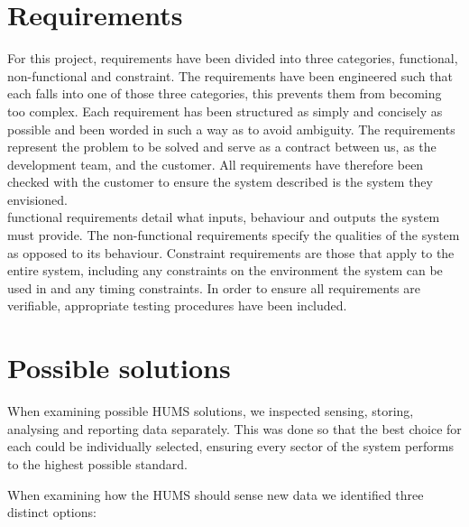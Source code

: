 \documentclass[10pt,a4paper]{article}
\begin{document}
\section{Requirements}

For this project, requirements have been divided into three categories,
functional, non-functional and constraint. The requirements have been
engineered such that each falls into one of those three categories, this
prevents them from becoming too complex. Each requirement has been
structured as simply and concisely as possible and been worded in such a way
as to avoid ambiguity. The requirements represent the problem to be solved
and serve as a contract between us, as the development team, and the
customer. All requirements have therefore been checked with the customer to
ensure the system described is the system they envisioned.\\
functional requirements detail what inputs, behaviour and outputs the system
must provide. The non-functional requirements specify the qualities of the
system as opposed to its behaviour. Constraint requirements are those that apply
to the entire system, including any constraints on the environment the system
can be used in and any timing constraints. In order to ensure all requirements
are verifiable, appropriate testing procedures have been included.








\section{Possible solutions}

When examining possible HUMS solutions, we inspected sensing, storing, analysing
and reporting data separately. This was done so that the best choice for each
could be individually selected, ensuring every sector of the system performs to
the highest possible standard. 

When examining how the HUMS should sense new data we identified three distinct
options:
\end{document}
